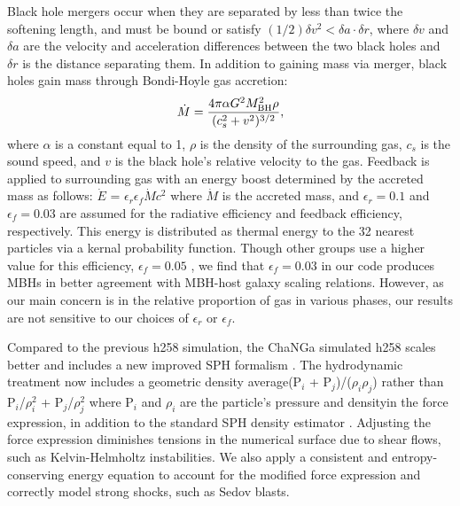 \documentclass[manuscript]{aastex}
\begin{document}
Black hole mergers occur when they are separated by less than twice the softening length, and must be bound or satisfy $(1/2) \delta v^2 < \delta a \cdot \delta r$,  where $\delta v$ and $\delta a$ are the velocity and acceleration differences between the two black holes and $\delta r$ is the distance separating them. In addition to gaining mass via merger, black holes gain mass through Bondi-Hoyle gas accretion:
\begin{equation}
\dot{M} = \frac{4 \pi \alpha G^2 M^{2}_{\rm BH} \rho}{(c^{2}_{s} + v^2)^{3/2}},
\end{equation}
where $\alpha$ is a constant equal to 1, $\rho$ is the density of the surrounding gas, $c_s$ is the sound speed, and $v$ is the black hole's relative velocity to the gas. Feedback is applied to surrounding gas with an energy boost determined by the accreted mass as follows: $\dot{E}$ = $\epsilon _{r}$$\epsilon_{f}$$\dot{M}$$c^2$ where $\dot{M}$ is the accreted mass, and $\epsilon _r = 0.1$ and $\epsilon _f = 0.03$ are assumed for the radiative efficiency and feedback efficiency, respectively. This energy is distributed as thermal energy to the 32 nearest particles via a kernal probability function. Though other groups use a higher value for this efficiency, $\epsilon _f = 0.05$ \citep{Sijacki2007,DiMatteo2008}, we find that $\epsilon_f = 0.03$ in our code produces MBHs in better agreement with MBH-host galaxy scaling relations. However, as our main concern is in the relative proportion of gas in various phases, our results are not sensitive to our choices of $\epsilon _{r}$ or $\epsilon_{f}$.

Compared to the previous h258 simulation, the ChaNGa simulated h258 scales better and includes a new improved SPH formalism \citep{Keller2014}. The hydrodynamic treatment now includes a geometric density average\textemdash (P$_i$ + P$_j$)/($\rho_i \rho_j$) rather than P$_i$/$\rho_{i}^2$ + P$_j$/$\rho_{j}^2$ where P$_i$ and $\rho_i$ are the particle's pressure and density\textemdash in the force expression, in addition to the standard SPH density estimator \citep{Ritchie2001}. Adjusting the force expression diminishes tensions in the numerical surface due to shear flows, such as Kelvin-Helmholtz instabilities. We also apply a consistent and entropy-conserving energy equation to account for the modified force expression and correctly model strong shocks, such as Sedov blasts. 


\end{document}
